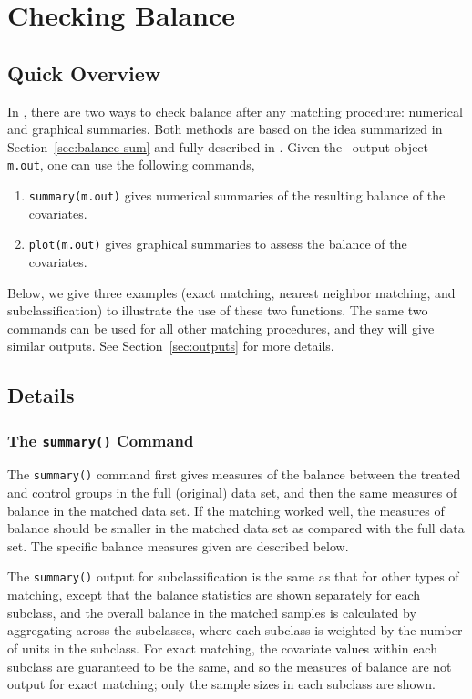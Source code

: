 \section{Checking Balance}
\label{sec:balance}

\subsection{Quick Overview}

In \MatchIt, there are two ways to check balance after any matching
procedure: numerical and graphical summaries. Both methods are based
on the idea summarized in Section~\ref{sec:balance-sum} and fully
described in \citet*{HoImaKin05}. Given the \MatchIt\ output object
{\tt m.out}, one can use the following commands,
\begin{enumerate}
\item \texttt{summary(m.out)} gives numerical summaries of the
  resulting balance of the covariates.
  
\item \texttt{plot(m.out)} gives graphical summaries to assess the
  balance of the covariates.
\end{enumerate}
Below, we give three examples (exact matching, nearest neighbor
matching, and subclassification) to illustrate the use of these two
functions. The same two commands can be used for all other matching
procedures, and they will give similar outputs.  See
Section~\ref{sec:outputs} for more details.


\subsection{Details}


\subsubsection{The {\tt summary()} Command}

The \texttt{summary()} command first gives measures of the balance between
the treated and control groups in the full (original) data set, and
then the same measures of balance in the matched data set.  If the
matching worked well, the measures of balance should be smaller in the
matched data set as compared with the full data set.  The specific balance measures given are described below.

The \texttt{summary()} output for subclassification is the
same as that for other types of matching, except that the balance
statistics are shown separately for each subclass, and the overall
balance in the matched samples is calculated by aggregating across the
subclasses, where each subclass is weighted by the number of units in
the subclass.  For exact matching, the covariate values within each subclass are guaranteed to 
be the same, and so the measures of balance are not output for exact matching; only the sample sizes in each
subclass are shown.

